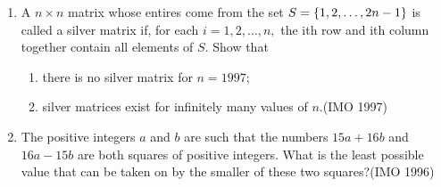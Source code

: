 \begin{enumerate}
\item A $n\times n$ matrix whose entires come from the set $S = \left\{1,2,\dots,2n-1\right\}$ is called a silver matrix if, for each ${i=1,2,\dots,n,}$ the ith row and ith column together contain all elements of $S$. Show that                                     
\begin{enumerate}                        
	\item there is no silver matrix for $n=1997$;      
\item silver matrices exist for infinitely many values of $n$.\hfill(IMO 1997) 
\end{enumerate}
\item The positive integers $a$ and $b$ are such that the numbers $15a+16b$ and $16a-15b$ are both squares of positive integers. What is the least possible value that can be taken on by the smaller of these two squares?\hfill(IMO 1996)
\end{enumerate}	
